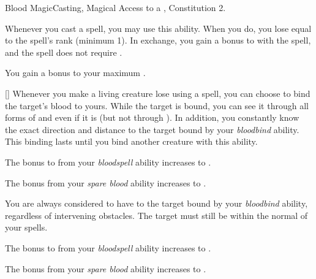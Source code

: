     \begin{feat}{Blood Magic}{Casting, Magical}
        \featpre Access to a , Constitution 2.

         Whenever you cast a spell, you may use this ability.
        When you do, you lose  equal to the spell's rank (minimum 1).
        In exchange, you gain a  bonus to  with the spell, and the spell does not require .

         You gain a  bonus to your maximum .

        [] Whenever you make a living creature lose  using a spell, you can choose to bind the target's blood to yours.
        While the target is bound, you can see it through all forms of  and even if it is  (but not through ).
        In addition, you constantly know the exact direction and distance to the target bound by your \textit{bloodbind} ability.
        This binding lasts until you bind another creature with this ability.

         The bonus to  from your \textit{bloodspell} ability increases to .

         The bonus from your \textit{spare blood} ability increases to .

         You are always considered to have  to the target bound by your \textit{bloodbind} ability, regardless of intervening obstacles.
        The target must still be within the normal  of your spells.

         The bonus to  from your \textit{bloodspell} ability increases to .

         The bonus from your \textit{spare blood} ability increases to .
    \end{feat}

